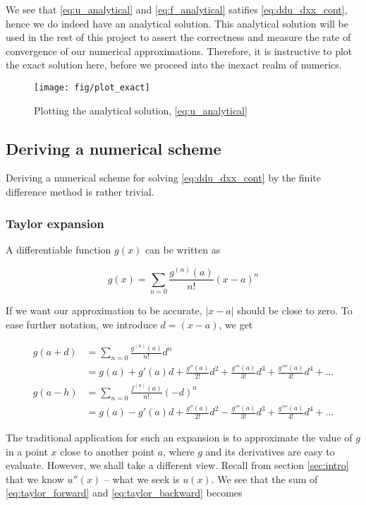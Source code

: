 \documentclass[a4paper]{article}
\begin{document}
We see that \eqref{eq:u_analytical} and \eqref{eq:f_analytical} satifies \eqref{eq:ddu_dxx_cont}, hence we do indeed have an analytical solution.
This analytical solution will be used in the rest of this project to assert the correctness and measure the rate of convergence of our numerical approximations.
Therefore, it is instructive to plot the exact solution here, before we proceed into the inexact realm of numerics.


\begin{figure}[ht]
\texttt{[image: fig/plot\_exact]}
\caption{Plotting the analytical solution, \eqref{eq:u_analytical}}
\end{figure}

\subsection{Deriving a numerical scheme}
Deriving a numerical scheme for solving \eqref{eq:ddu_dxx_cont} by the finite difference method is rather trivial.

\subsubsection{Taylor expansion}
\label{sec:taylor}
A differentiable function $g(x)$ can be written as

\begin{equation}
    g(x) = \sum_{n=0} \frac{g^{(n)}(a)}{n!} (x-a)^n
\end{equation}

If we want our approximation to be accurate, $|x - a|$ should be close to zero. To ease further notation, we introduce $d = (x - a)$, we get

\begin{align}
    g(a+d)
    &= \sum_{n=0} \frac{g^{(n)}(a)}{n!} d^n \nonumber \\
    &= g(a) + g'(a) d + \frac{g''(a)}{2!} d^2 + \frac{g'''(a)}{3!} d^3
            + \frac{g''''(a)}{4!} d^4 + \dots \label{eq:taylor_forward}\\
    g(a-h)
    &= \sum_{n=0} \frac{f^{(n)}(a)}{n!} (-d)^n \nonumber \\
    &= g(a) - g'(a) d + \frac{g''(a)}{2!} d^2 - \frac{g'''(a)}{3!} d^3
            + \frac{g''''(a)}{4!} d^4 + \dots \label{eq:taylor_backward}
\end{align}

The traditional application for such an expansion is to approximate the value of $g$ in a point $x$ close to another point $a$, where $g$ and its derivatives are easy to evaluate. However, we shall take a different view. Recall from section \ref{sec:intro} that we know $u''(x)$ -- what we seek is $u(x)$. We see that the sum of \eqref{eq:taylor_forward} and \eqref{eq:taylor_backward} becomes
\end{document}
